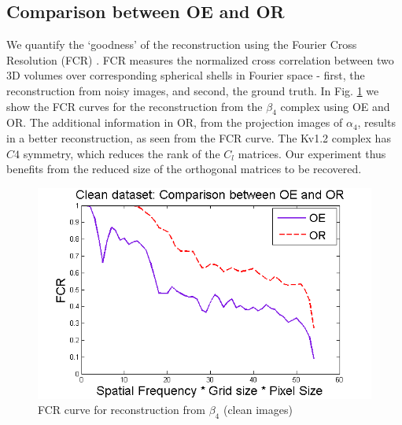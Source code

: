 \documentclass{article}
\begin{document}
\subsection{Comparison between OE and OR}
We quantify the `goodness' of the reconstruction using the Fourier Cross Resolution (FCR)
\cite{fcr}. FCR measures the normalized cross correlation between two 3D volumes over
corresponding spherical shells in Fourier space - first, the reconstruction from noisy
images, and second, the ground truth. In Fig. \ref{fig:fsc} we show the FCR curves for the
reconstruction from the $\beta_4$ complex using OE and OR. The additional information in
OR, from the projection images of $\alpha_4$, results in a better reconstruction, as seen
from the FCR curve. The Kv1.2 complex has $C4$ symmetry, which reduces the rank of the
$C_l$ matrices. Our experiment thus benefits from the reduced size of the orthogonal
matrices to be recovered.

\begin{figure}[t]
  \centering
  \includegraphics[width=.7\columnwidth]{FSC_final.png}
  \caption{FCR curve for reconstruction from $\beta_4$ (clean images)}\label{fig:fsc}
\end{figure}
\vspace{-.15in}
\end{document}
